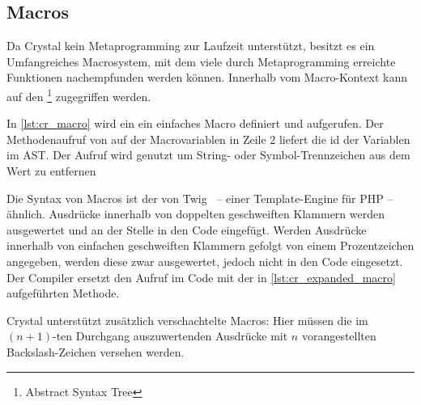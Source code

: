 \subsection{Macros}
\label{ssec:gc_macros}

Da Crystal kein Metaprogramming zur Laufzeit unterstützt, besitzt es ein
Umfangreiches Macrosystem, mit dem viele durch Metaprogramming erreichte
Funktionen nachempfunden werden können.  Innerhalb vom Macro-Kontext kann auf
den  \footnote{Abstract Syntax Tree} zugegriffen werden.

In \cref{lst:cr_macro} wird ein ein einfaches Macro definiert und aufgerufen.
Der Methodenaufruf von  auf der Macrovariablen  in Zeile 2
liefert die id der Variablen im AST.  Der Aufruf wird genutzt um String- oder
Symbol-Trennzeichen aus dem Wert zu entfernen




Die Syntax von Macros ist der von Twig~\cite{twig} -- einer Template-Engine für
PHP -- ähnlich.  Ausdrücke innerhalb von doppelten geschweiften Klammern werden
ausgewertet und an der Stelle in den Code eingefügt.  Werden Ausdrücke innerhalb
von einfachen geschweiften Klammern gefolgt von einem Prozentzeichen angegeben,
werden diese zwar ausgewertet, jedoch nicht in den Code eingesetzt.  Der
Compiler ersetzt den Aufruf im Code mit der in \cref{lst:cr_expanded_macro}
aufgeführten Methode.



Crystal unterstützt zusätzlich verschachtelte Macros:  Hier müssen die im $(n +
1)$-ten Durchgang auszuwertenden Ausdrücke mit $n$ vorangestellten
Backslash-Zeichen versehen werden.
